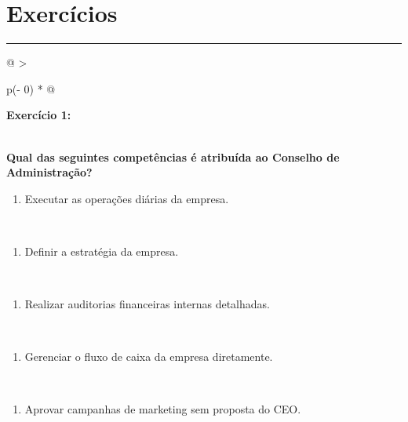 \documentclass[
]{book}
\providecommand{\tightlist}{%
  \setlength{\itemsep}{0pt}\setlength{\parskip}{0pt}}
\begin{document}
\section{Exercícios}\label{exercuxedcios-2}

\begin{center}\rule{0.5\linewidth}{0.5pt}\end{center}

\begin{longtable}[]{@{}
  >{\raggedright\arraybackslash}p{(\columnwidth - 0\tabcolsep) * }@{}}
\toprule\noalign{}
\begin{minipage}[b]{\linewidth}\raggedright
\textbf{Exercício 1:}
\end{minipage} \\
\midrule\noalign{}
\endhead
\bottomrule\noalign{}
\endlastfoot
\textbf{Qual das seguintes competências é atribuída ao Conselho de Administração?} \\
\begin{minipage}[t]{\linewidth}\raggedright
\begin{enumerate}
\def\labelenumi{\alph{enumi})}
\tightlist
\item
  Executar as operações diárias da empresa.
\end{enumerate}
\end{minipage} \\
\begin{minipage}[t]{\linewidth}\raggedright
\begin{enumerate}
\def\labelenumi{\alph{enumi})}
\setcounter{enumi}{1}
\tightlist
\item
  Definir a estratégia da empresa.
\end{enumerate}
\end{minipage} \\
\begin{minipage}[t]{\linewidth}\raggedright
\begin{enumerate}
\def\labelenumi{\alph{enumi})}
\setcounter{enumi}{2}
\tightlist
\item
  Realizar auditorias financeiras internas detalhadas.
\end{enumerate}
\end{minipage} \\
\begin{minipage}[t]{\linewidth}\raggedright
\begin{enumerate}
\def\labelenumi{\alph{enumi})}
\setcounter{enumi}{3}
\tightlist
\item
  Gerenciar o fluxo de caixa da empresa diretamente.
\end{enumerate}
\end{minipage} \\
\begin{minipage}[t]{\linewidth}\raggedright
\begin{enumerate}
\def\labelenumi{\alph{enumi})}
\setcounter{enumi}{4}
\tightlist
\item
  Aprovar campanhas de marketing sem proposta do CEO.
\end{enumerate}
\end{minipage} \\
\end{longtable}
\end{document}
